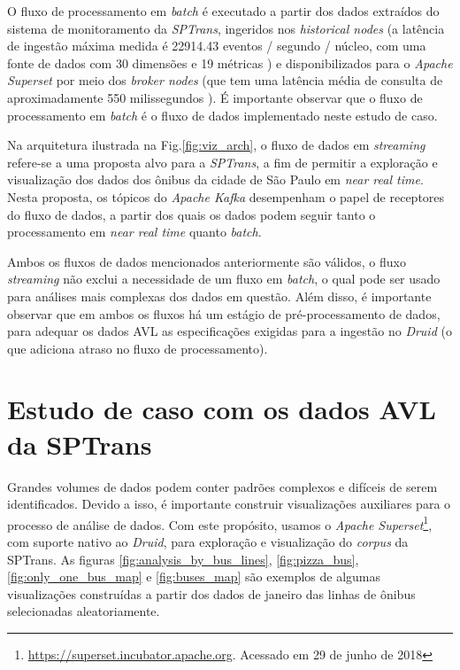 \documentclass[
	12pt,				%
	oneside,			%
	a4paper,			%
	english,			%
	brazil				%
	]{abntex2ppgsi}
\begin{document}
O fluxo de processamento em \textit{batch} é executado a partir dos dados extraídos do sistema de monitoramento da \textit{SPTrans}, ingeridos nos \textit{historical nodes} (a latência de ingestão máxima medida é 22914.43 eventos / segundo / núcleo, com uma fonte de dados com 30 dimensões e 19 métricas \cite{yang2014druid}) e disponibilizados para o \textit{Apache Superset} por meio dos \textit{broker nodes} (que tem uma latência média de consulta de aproximadamente 550 milissegundos \cite{yang2014druid}). É importante observar que o fluxo de processamento em \textit{batch} é o fluxo de dados implementado neste estudo de caso.

Na arquitetura ilustrada na Fig.\ref{fig:viz_arch}, o fluxo de dados em \textit{streaming} refere-se a uma proposta alvo para a \textit{SPTrans}, a fim de permitir a exploração e visualização dos dados dos ônibus da cidade de São Paulo em \textit{near real time}. Nesta proposta, os tópicos do \textit{Apache Kafka} desempenham o papel de receptores do fluxo de dados, a partir dos quais os dados podem seguir tanto o processamento em \textit{near real time} quanto \textit{batch}.

Ambos os fluxos de dados mencionados anteriormente são válidos, o fluxo \textit{streaming} não exclui a necessidade de um fluxo em \textit{batch}, o qual pode ser usado para análises mais complexas dos dados em questão. Além disso, é importante observar que em ambos os fluxos há um estágio de pré-processamento de dados, para adequar os dados AVL as especificações exigidas para a ingestão no \textit{Druid} (o que adiciona atraso no fluxo de processamento).

\section{Estudo de caso com os dados AVL da SPTrans}
\label{viz_case}

Grandes volumes de dados podem conter padrões complexos e difíceis de serem identificados. Devido a isso, é importante construir visualizações auxiliares para o processo de análise de dados. Com este propósito, usamos o \textit{Apache Superset}\footnote{\url{https://superset.incubator.apache.org}. Acessado em 29 de junho de 2018}, com suporte nativo ao \textit{Druid}, para exploração e visualização do \textit{corpus} da SPTrans. As figuras \ref{fig:analysis_by_bus_lines}, \ref{fig:pizza_bus}, \ref{fig:only_one_bus_map} e \ref{fig:buses_map} são exemplos de algumas visualizações construídas a partir dos dados de janeiro das linhas de ônibus selecionadas aleatoriamente.
\end{document}
